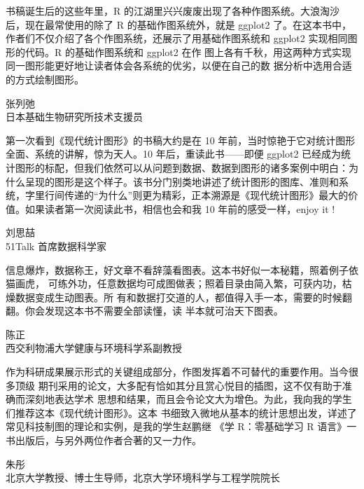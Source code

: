 \documentclass[
  b5paper,
  UTF8,twoside]{book}
\begin{document}
书稿诞生后的这些年里，R 的江湖里兴兴废废出现了各种作图系统。大浪淘沙后，现在最常使用的除了 R 的基础作图系统外，就是 ggplot2 了。在这本书中，作者们不仅介绍了各个作图系统，还展示了用基础作图系统和 ggplot2 实现相同图形的代码。R 的基础作图系统和 ggplot2 在作 图上各有千秋，用这两种方式实现同一图形能更好地让读者体会各系统的优劣，以便在自己的数 据分析中选用合适的方式绘制图形。

\begin{flushright}
张列弛\\
日本基础生物研究所技术支援员
\end{flushright}

第一次看到《现代统计图形》的书稿大约是在 10 年前，当时惊艳于它对统计图形全面、系统的讲解，惊为天人。10 年后，重读此书------即便 ggplot2 已经成为统计图形的标配，但我们依然可以从问题到数据、数据到图形的诸多案例中明白：为什么呈现的图形是这个样子。该书分门别类地讲述了统计图形的图库、准则和系统，字里行间传递的``为什么''则更为精彩，正本溯源是《现代统计图形》最大的价值。如果读者第一次阅读此书，相信也会和我 10 年前的感受一样，enjoy it !

\begin{flushright}
刘思喆\\
51Talk 首席数据科学家
\end{flushright}

信息爆炸，数据称王，好文章不看辞藻看图表。这本书好似一本秘籍，照着例子依猫画虎， 可练外功，任意数据均可成图做表；照着目录由简入繁，可获内功，枯燥数据变成生动图表。所 有和数据打交道的人，都值得入手一本，需要的时候翻翻。你会发现这本书不需要全部读懂，读 半本就可治天下图表。

\begin{flushright}
陈正\\
西交利物浦大学健康与环境科学系副教授
\end{flushright}

作为科研成果展示形式的关键组成部分，作图发挥着不可替代的重要作用。当今很多顶级 期刊采用的论文，大多配有恰如其分且赏心悦目的插图，这不仅有助于准确而深刻地表达学术 思想和结果，而且会令论文大为增色。为此，我向我的学生们推荐这本《现代统计图形》。这本 书细致入微地从基本的统计思想出发，详述了常见科技制图的理论和实例，是我的学生赵鹏继
《学 R：零基础学习 R 语言》一书出版后，与另外两位作者合著的又一力作。

\begin{flushright}
朱彤\\
北京大学教授、博士生导师，北京大学环境科学与工程学院院长
\end{flushright}
\end{document}
